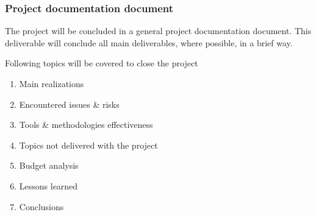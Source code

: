 \subsubsection{Project documentation document}
The project will be concluded in a general project documentation document. This deliverable will conclude all main deliverables, where possible, in a brief way.

Following topics will be covered to close the project


 	\begin{enumerate}
		\item Main realizations
		\item Encountered issues \& risks
		\item Tools \& methodologies effectiveness
		\item Topics not delivered with the project
		\item Budget analysis
		\item Lessons learned
		\item Conclusions
	\end {enumerate}